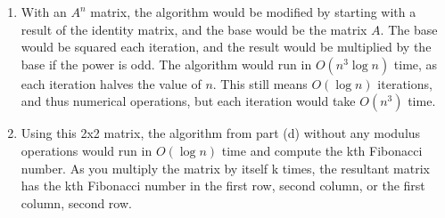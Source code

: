 \documentclass{article}
\begin{document}
\begin{enumerate}
\begin{enumerate}
        \item With an $A^n$ matrix, the algorithm would be modified by starting with a result of the identity matrix, and the base would be the matrix $A$. The base would be squared each iteration, and the result would be multiplied by the base if the power is odd. The algorithm would run in $O(n^3 \log n)$ time, as each iteration halves the value of $n$. This still means $O(\log n)$ iterations, and thus numerical operations, but each iteration would take $O(n^3)$ time. \\
        \item Using this 2x2 matrix, the algorithm from part (d) without any modulus operations would run in $O(\log n)$ time and compute the kth Fibonacci number. As you multiply the matrix by itself k times, the resultant matrix has the kth Fibonacci number in the first row, second column, or the first column, second row. \\
        

\end{enumerate}
\end{enumerate}
\end{document}
